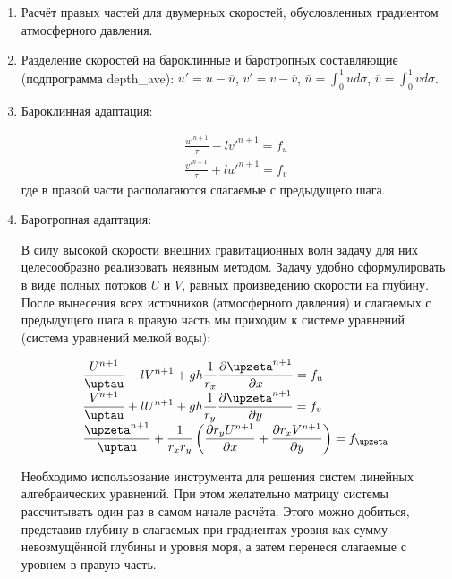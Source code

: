 \begin{enumerate}
\item Расчёт правых частей для двумерных скоростей, обусловленных градиентом атмосферного давления.

\item Разделение скоростей на бароклинные и баротропных составляющие (подпрограмма depth\_ave): $u' = u - \overline{u}$, $v' = v - \overline{v}$, $\overline{u} = \int_0^1 u d\sigma$, $\overline{v} = \int_0^1 v d\sigma$.

\item Бароклинная адаптация:

\begin{equation} \label{eq:inmsom/19} 
\begin{array}{l} 
\displaystyle{ \frac{u'^{n+1}}{\tau} - l v'^{n+1} = f_u } \\
\displaystyle{ \frac{v'^{n+1}}{\tau} + l u'^{n+1} = f_v }
\end{array} 
\end{equation} 
где в правой части располагаются слагаемые с предыдущего шага. 

\item Баротропная адаптация:

В силу высокой скорости внешних гравитационных волн задачу для них целесообразно реализовать неявным методом. 
Задачу удобно сформулировать в виде полных потоков $U$ и $V$, равных произведению скорости на глубину. 
После вынесения всех источников (атмосферного давления) и слагаемых с предыдущего шага в правую часть мы приходим к системе уравнений (система уравнений мелкой воды):

\begin{equation} \label{eq:inmsom/20} 
\begin{array}{l} 
\displaystyle{ \frac{U^{n+1}}{\tau} - l V^{n+1} + gh\frac{1}{r_x}\d{\zeta^{n+1}}{x} = f_u} \\
\displaystyle{ \frac{V^{n+1}}{\tau} + l U^{n+1} + gh\frac{1}{r_y}\d{\zeta^{n+1}}{y} = f_v} \\
\displaystyle{ \frac{\zeta^{n+1}}{\tau} + \frac{1}{r_x r_y} \left( \d{r_y U^{n+1}}{x} + \d{r_x V^{n+1}}{y} \right) = f_\zeta}
\end{array} 
\end{equation} 

Необходимо использование инструмента для решения систем линейных алгебраических уравнений. При этом желательно матрицу системы рассчитывать один раз в самом начале расчёта. Этого можно добиться, представив глубину в слагаемых при градиентах уровня как сумму невозмущённой глубины и уровня моря, а затем перенеся слагаемые с уровнем в правую часть.

\end{enumerate}

